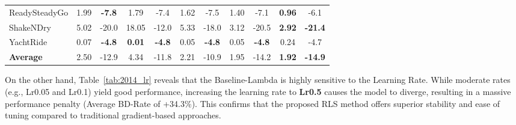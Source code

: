 \begin{table}[htbp]
{\begin{tabular}{lcccccccccc}
            ReadySteadyGo     & 1.99          & \textbf{-7.8} & 1.79          & -7.4          & 1.62          & -7.5          & 1.40          & -7.1          & \textbf{0.96} & -6.1 \\
            ShakeNDry         & 5.02          & -20.0         & 18.05         & -12.0         & 5.33          & -18.0         & 3.12          & -20.5         & \textbf{2.92} & \textbf{-21.4} \\
            YachtRide         & 0.07          & \textbf{-4.8} & \textbf{0.01} & \textbf{-4.8} & 0.05          & \textbf{-4.8} & 0.05          & \textbf{-4.8} & 0.24          & -4.7 \\
            \midrule
            \textbf{Average}  & 2.50          & -12.9         & 4.34          & -11.8         & 2.21          & -10.9         & 1.95          & -14.2         & \textbf{1.92} & \textbf{-14.9} \\
            \bottomrule
        \end{tabular}%
    }
\end{table}

On the other hand, Table~\ref{tab:2014_lr} reveals that the Baseline-Lambda is highly sensitive to the Learning Rate. While moderate rates (e.g., Lr0.05 and Lr0.1) yield good performance, increasing the learning rate to \textbf{Lr0.5} causes the model to diverge, resulting in a massive performance penalty (Average BD-Rate of +34.3\%). This confirms that the proposed RLS method offers superior stability and ease of tuning compared to traditional gradient-based approaches.

